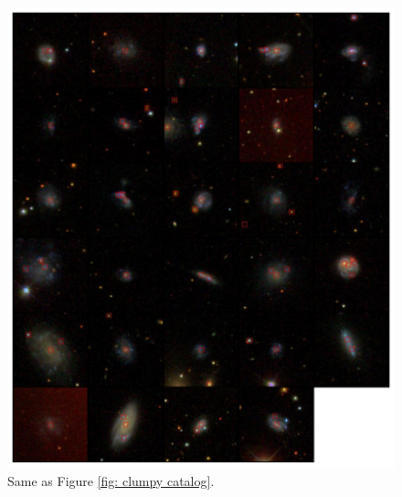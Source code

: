 \begin{figure}
\includegraphics[width=\textwidth]{Figures/display_all_clumpy_jpegs_group3.pdf}
\caption[Visual catalog of SDSS Stripe 82 ``clumpy'' galaxies.]{Same as Figure \ref{fig: clumpy catalog}.}
\end{figure}